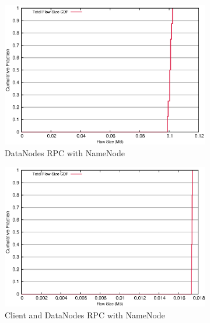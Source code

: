\begin{figure}[!htpb]
\centering
  \begin{subfigure}[b]{.45\linewidth}
   \centering
	\includegraphics[width=.99\textwidth]{figures/6writes/24_28_type_flow_size.eps} 
	\caption{DataNodes RPC with NameNode}\label{fig:write_size:dn_rpc}
   \end{subfigure}%
  \begin{subfigure}[b]{.45\linewidth}
   \centering
	\includegraphics[width=.99\textwidth]{figures/6writes/24_28_20_16_type_flow_size.eps} 
	\caption{Client and DataNodes RPC with NameNode}\label{fig:write_size:dc_rpc}
   \end{subfigure} \\%
  \begin{subfigure}[b]{.45\linewidth}
   \centering

\end{subfigure}
\end{figure}
